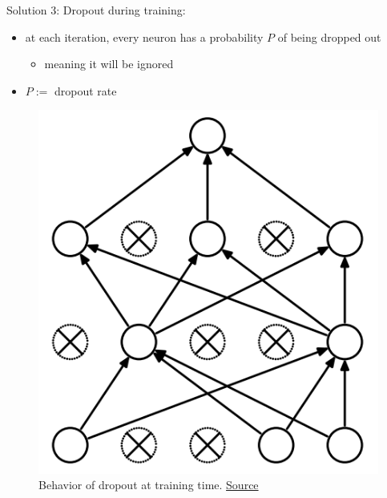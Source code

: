 \begin{frame}{Solution 3: Dropout}
	during training:
	\begin{itemize}
		\item at each iteration, every neuron has a probability $P$ of being dropped out
		\begin{itemize}
			\item meaning it will be ignored
		\end{itemize}
		\item $P :=$ dropout rate
	\end{itemize}
	
	\begin{figure}[H]
		\centering
		\includegraphics[height=0.4\textheight]{Figs/Dropout-after.png}
		\caption{Behavior of dropout at training time. \href{https://www.cs.toronto.edu/~hinton/absps/JMLRdropout.pdf}{Source}}
	\end{figure}
\end{frame}
